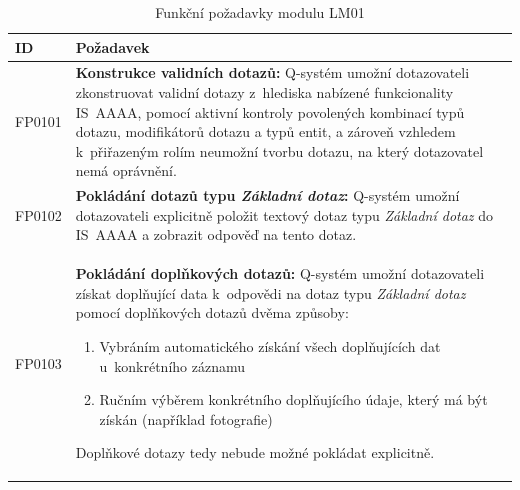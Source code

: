 \documentclass[thesis=M,czech]{FITthesis}[2019/12/23]
\begin{document}
\begin{table}[H]
	\centering
	\begin{tabular}{|p{}|p{}|}
		\hline
  		{\textbf{ID}} & {\textbf{Požadavek}} \\
  		\hline \hline
  		FP0101 & \textbf{Konstrukce validních dotazů:} Q-systém umožní dotazovateli zkonstruovat validní dotazy z~hlediska nabízené funkcionality IS~AAAA, pomocí aktivní kontroly povolených kombinací typů dotazu, modifikátorů dotazu a typů entit, a zároveň vzhledem k~přiřazeným rolím neumožní tvorbu dotazu, na který dotazovatel nemá oprávnění.  \\ \hline
		FP0102 & \textbf{Pokládání dotazů typu \textit{Základní dotaz}:} Q-systém umožní dotazovateli explicitně položit textový dotaz typu \textit{Základní dotaz} do IS~AAAA a zobrazit odpověď na tento dotaz. \\ \hline
		FP0103 & \textbf{Pokládání doplňkových dotazů:} Q-systém umožní dotazovateli získat doplňující data k~odpovědi na dotaz typu \textit{Základní dotaz} pomocí doplňkových dotazů dvěma způsoby:
		\begin{enumerate}
			\item Vybráním automatického získání všech doplňujících dat u~konkrétního záznamu
			\item Ručním výběrem konkrétního doplňujícího údaje, který má být získán (například fotografie)
		\end{enumerate}
		\label{FP0103}
Doplňkové dotazy tedy nebude možné pokládat explicitně.  \\ \hline
	\end{tabular}
 	\caption{Funkční požadavky modulu LM01}
\label{tab:Funkční požadavky modulu LM01}
\end{table}
\end{document}
